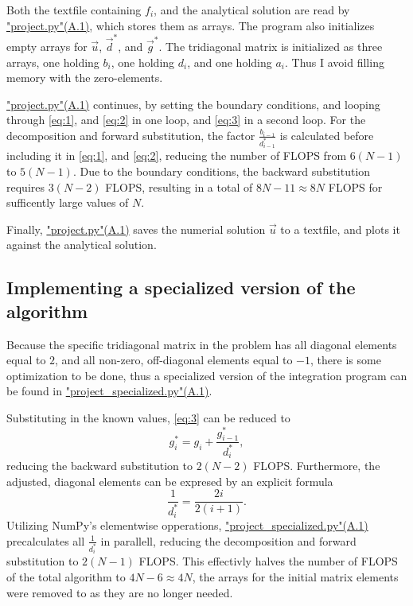 \documentclass[english,notitlepage]{revtex4-1}  %
\begin{document}
Both the textfile containing \(f_{i}\), and the analytical solution are read by \hyperref[A:1]{"project.py"(A.1)}, which stores them as arrays. The program also initializes empty arrays for \(\vec{u}\), \(\vec{d}^{*}\), and \(\vec{g}^{*}\). The tridiagonal matrix is initialized as three arrays, one holding \(b_{i}\), one holding \(d_{i}\), and one holding \(a_{i}\). Thus I avoid filling memory with the zero-elements.

\hyperref[A:1]{"project.py"(A.1)} continues, by setting the boundary conditions, and looping through \eqref{eq:1}, and \eqref{eq:2} in one loop, and \eqref{eq:3} in a second loop. For the decomposition and forward substitution, the factor \(\frac{b_{i-1}}{d_{i-1}^{*}}\) is calculated before including it in \eqref{eq:1}, and \eqref{eq:2}, reducing the number of FLOPS from \(6(N-1)\) to \(5(N-1)\). Due to the boundary conditions, the backward substitution requires \(3(N-2)\) FLOPS, resulting in a total of \(8N-11\approx 8N\) FLOPS for sufficently large values of \(N\).

Finally, \hyperref[A:1]{"project.py"(A.1)} saves the numerial solution \(\vec{u}\) to a textfile, and plots it against the analytical solution.

\subsection{Implementing a specialized version of the algorithm}\label{subsec:32}
Because the specific tridiagonal matrix in the problem has all diagonal elements equal to \(2\), and all non-zero, off-diagonal elements equal to \(-1\), there is some optimization to be done, thus a specialized version of the integration program can be found in \hyperref[A:2]{"project\_specialized.py"(A.1)}.

Substituting in the known values, \eqref{eq:3} can be reduced to
$$
	g_{i}^{*} = g_{i} + \frac{g_{i-1}^{*}}{d_{i}^{*}},
$$
reducing the backward substitution to \(2(N-2)\) FLOPS.
Furthermore, the adjusted, diagonal elements can be expresed by an explicit formula
$$
	\frac{1}{d_{i}^{*}}=\frac{2i}{2(i+1)}.
$$
Utilizing NumPy's elementwise opperations, \hyperref[A:2]{"project\_specialized.py"(A.1)} precalculates all \(\frac{1}{d_{i}^{*}}\) in parallell, reducing the decomposition and forward substitution to \(2(N-1)\) FLOPS. This effectivly halves the number of FLOPS of the total algorithm to \(4N-6\approx 4N\), the arrays for the initial matrix elements were removed to as they are no longer needed.
\end{document}
